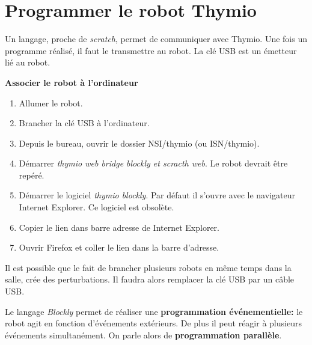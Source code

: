 \documentclass[a4paper,11pt]{article}
\begin{document}
\section{Programmer le robot Thymio}
Un langage, proche de \emph{scratch}, permet de communiquer avec Thymio. Une fois un programme réalisé, il faut le transmettre au robot. La clé USB est un émetteur lié au robot.
\begin{activite} \textbf{Associer le robot à l'ordinateur}
\begin{enumerate}    
    \item Allumer le robot.
    \item Brancher la clé USB à l'ordinateur.
    \item Depuis le bureau, ouvrir le dossier NSI/thymio (ou ISN/thymio).
    \item Démarrer \emph{thymio web bridge blockly et scracth web}. Le robot devrait être repéré.
    \item Démarrer le logiciel \emph{thymio blockly}. Par défaut il s'ouvre avec le navigateur Internet Explorer. Ce logiciel est obsolète.
    \item Copier le lien dans barre adresse de Internet Explorer.
    \item Ouvrir Firefox et coller le lien dans la barre d'adresse.
\end{enumerate}
\end{activite}
\begin{aretenir}[Remarque]
Il est possible que le fait de brancher plusieurs robots en même temps dans la salle, crée des perturbations. Il faudra alors remplacer la clé USB par un câble USB.
\end{aretenir}
Le langage \emph{Blockly} permet de réaliser une \textbf{programmation événementielle:} le robot agit en fonction d'événements extérieurs. De plus il peut réagir à plusieurs événements simultanément. On parle alors de \textbf{programmation parallèle}.
\end{document}

